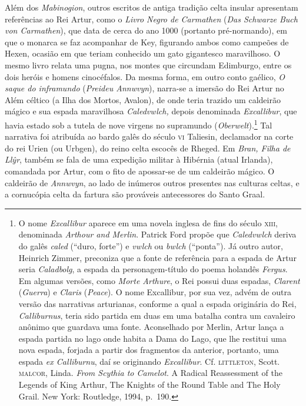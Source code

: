 Além dos \textit{Mabinogion}, outros escritos de antiga tradição celta
insular apresentam referências ao Rei Artur, como o \textit{Livro Negro
de Carmathen} (\textit{Das Schwarze Buch von Carmathen}), que data de
cerca do ano 1000 (portanto pré-normando), em que o monarca se faz
acompanhar de Key, figurando ambos como campeões de Hexen, ocasião em
que teriam conhecido um gato gigantesco maravilhoso. O mesmo livro
relata uma pugna, nos montes que circundam Edimburgo, entre os dois
heróis e homens cinocéfalos. Da mesma forma, em outro conto gaélico,
\textit{O saque do inframundo} (\textit{Preideu Annwvyn}), narra-se a
imersão do Rei Artur no Além céltico (a Ilha dos Mortos, Avalon), de
onde teria trazido um caldeirão mágico e sua espada maravilhosa
\textit{Caledvwlch,} depois denominada \textit{Excallibur}, que havia
estado sob a tutela de nove virgens no supramundo
(\textit{Oberwelt}).\footnote{ O nome \textit{Excallibur} aparece em uma
novela inglesa de fins do século \textsc{xiii}, denominada \textit{Arthour and
Merlin}. Patrick Ford propõe que \textit{Caledvwlch} deriva do galês
\textit{caled} (“duro, forte”) e \textit{vwlch} ou \textit{bwlch}
(“ponta”). Já outro autor, Heinrich Zimmer, preconiza que a fonte de
referência para a espada de Artur seria \textit{Caladbolg}, a espada da
personagem-título do poema holandês \textit{Fergus}. Em algumas
versões, como \textit{Morte Arthure}, o Rei possui duas espadas,
\textit{Clarent} (\textit{Guerra}) e \textit{Claris} (\textit{Peace}).
O nome Excallibur, por sua vez, advém de outra versão das narrativas
arturianas, conforme a qual a espada originária do Rei,
\textit{Calliburnus}, teria sido partida em duas em uma batalha contra
um cavaleiro anônimo que guardava uma fonte. Aconselhado por Merlin,
Artur lança a espada partida no lago onde habita a Dama do Lago, que
lhe restitui uma nova espada, forjada a partir dos fragmentos da
anterior, portanto, uma espada \textit{ex Calliburnu}, daí se
originando \textit{Excallibur}. Cf. \textsc{littleton}, Scott. \textsc{malcor},
Linda. \textit{From Scythia to Camelot}. A Radical Reassessment of the
Legends of King Arthur, The Knights of the Round Table and The Holy
Grail. New York: Routledge, 1994, p.~190.} Tal narrativa foi
atribuída ao bardo galês do século \textsc{vi} Taliesin, declamador na corte do
rei Urien (ou Urbgen), do reino celta escocês de Rheged. Em
\textit{Bran, Filha de Ll\^yr}, também se fala de uma expedição militar
à Hibérnia (atual Irlanda), comandada por Artur, com o fito de
apossar-se de um caldeirão mágico. O caldeirão de \textit{Annwvyn}, ao
lado de inúmeros outros presentes nas culturas celtas, e a cornucópia
celta da fartura são prováveis antecessores do Santo Graal. 

